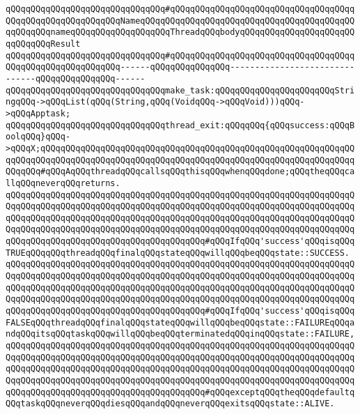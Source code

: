 \verb|qQQqqQQqqQQqqQQqqQQqqQQqqQQqqQQq#qQQqqQQqqQQqqQQqqQQqqQQqqQQqqQQqqQQqqQQqqQQqqQQqqQQqqQQqqQQqNameqQQqqQQqqQQqqQQqqQQqqQQqqQQqqQQqqQQqqQQqqQQqqQQqqQQqnameqQQqqQQqqQQqqQQqqQQqThreadqQQqbodyqQQqqQQqqQQqqQQqqQQqqQQqqQQqqQQqResult|\newline
\verb|qQQqqQQqqQQqqQQqqQQqqQQqqQQqqQQq#qQQqqQQqqQQqqQQqqQQqqQQqqQQqqQQqqQQqqQQqqQQqqQQqqQQqqQQqqQQq------qQQqqQQqqQQqqQQq-------------------------------qQQqqQQqqQQqqQQq------|\newline
\verb|qQQqqQQqqQQqqQQqqQQqqQQqqQQqqQQqmake_task:qQQqqQQqqQQqqQQqqQQqqQQqStringqQQq->qQQqList(qQQq(String,qQQq(VoidqQQq->qQQqVoid)))qQQq->qQQqApptask;|\newline
\newline
\verb|qQQqqQQqqQQqqQQqqQQqqQQqqQQqqQQqthread_exit:qQQqqQQq{qQQqsuccess:qQQqBoolqQQq}qQQq->qQQqX;qQQqqQQqqQQqqQQqqQQqqQQqqQQqqQQqqQQqqQQqqQQqqQQqqQQqqQQqqQQqqQQqqQQqqQQqqQQqqQQqqQQqqQQqqQQqqQQqqQQqqQQqqQQqqQQqqQQqqQQqqQQqqQQqqQQqqQQqqQQq#qQQqAqQQqthreadqQQqcallsqQQqthisqQQqwhenqQQqdone;qQQqtheqQQqcallqQQqneverqQQqreturns.|\newline
\verb|qQQqqQQqqQQqqQQqqQQqqQQqqQQqqQQqqQQqqQQqqQQqqQQqqQQqqQQqqQQqqQQqqQQqqQQqqQQqqQQqqQQqqQQqqQQqqQQqqQQqqQQqqQQqqQQqqQQqqQQqqQQqqQQqqQQqqQQqqQQqqQQqqQQqqQQqqQQqqQQqqQQqqQQqqQQqqQQqqQQqqQQqqQQqqQQqqQQqqQQqqQQqqQQqqQQqqQQqqQQqqQQqqQQqqQQqqQQqqQQqqQQqqQQqqQQqqQQqqQQqqQQqqQQqqQQqqQQqqQQqqQQqqQQqqQQqqQQqqQQqqQQqqQQqqQQqqQQqqQQq#qQQqIfqQQq'success'qQQqisqQQqTRUEqQQqqQQqthreadqQQqfinalqQQqstateqQQqwillqQQqbeqQQqstate::SUCCESS.|\newline
\verb|qQQqqQQqqQQqqQQqqQQqqQQqqQQqqQQqqQQqqQQqqQQqqQQqqQQqqQQqqQQqqQQqqQQqqQQqqQQqqQQqqQQqqQQqqQQqqQQqqQQqqQQqqQQqqQQqqQQqqQQqqQQqqQQqqQQqqQQqqQQqqQQqqQQqqQQqqQQqqQQqqQQqqQQqqQQqqQQqqQQqqQQqqQQqqQQqqQQqqQQqqQQqqQQqqQQqqQQqqQQqqQQqqQQqqQQqqQQqqQQqqQQqqQQqqQQqqQQqqQQqqQQqqQQqqQQqqQQqqQQqqQQqqQQqqQQqqQQqqQQqqQQqqQQqqQQqqQQqqQQq#qQQqIfqQQq'success'qQQqisqQQqFALSEqQQqthreadqQQqfinalqQQqstateqQQqwillqQQqbeqQQqstate::FAILUREqQQqandqQQqitsqQQqtaskqQQqwillqQQqbeqQQqterminatedqQQqinqQQqstate::FAILURE,|\newline
\verb|qQQqqQQqqQQqqQQqqQQqqQQqqQQqqQQqqQQqqQQqqQQqqQQqqQQqqQQqqQQqqQQqqQQqqQQqqQQqqQQqqQQqqQQqqQQqqQQqqQQqqQQqqQQqqQQqqQQqqQQqqQQqqQQqqQQqqQQqqQQqqQQqqQQqqQQqqQQqqQQqqQQqqQQqqQQqqQQqqQQqqQQqqQQqqQQqqQQqqQQqqQQqqQQqqQQqqQQqqQQqqQQqqQQqqQQqqQQqqQQqqQQqqQQqqQQqqQQqqQQqqQQqqQQqqQQqqQQqqQQqqQQqqQQqqQQqqQQqqQQqqQQqqQQqqQQqqQQqqQQq#qQQqexceptqQQqtheqQQqdefaultqQQqtaskqQQqneverqQQqdiesqQQqandqQQqneverqQQqexitsqQQqstate::ALIVE.|\newline

